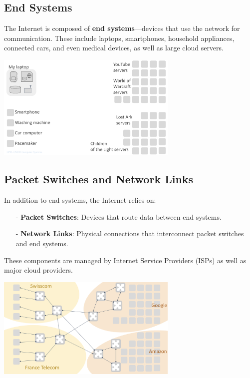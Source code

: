 \subsection{End Systems}

The Internet is composed of \textbf{end systems}—devices that use the network for communication. These include laptops, smartphones, household appliances, connected cars, and even medical devices, as well as large cloud servers.

\begin{center}
  \includegraphics[width=0.65\textwidth]{chapters/L1/images/endsys.png}
\end{center}
\vfill
\newpage
\subsection{Packet Switches and Network Links}

In addition to end systems, the Internet relies on:
\begin{itemize}
  \item[-] \textbf{Packet Switches}: Devices that route data between end systems.
  \item[-] \textbf{Network Links}: Physical connections that interconnect packet switches and end systems.
\end{itemize}

These components are managed by Internet Service Providers (ISPs) as well as major cloud providers.

\begin{center}
  \includegraphics[width=0.65\textwidth]{chapters/L1/images/internet_schema.png}
\end{center}

